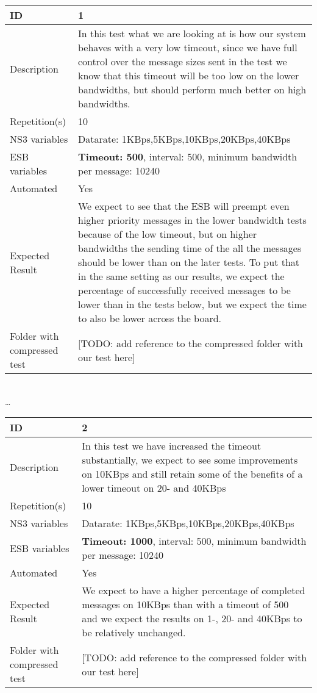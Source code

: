 \begin{center}

\begin{tabular}{| p{4cm} | p{8cm} |}%
	\hline
	ID & 1 \\
	\hline
	Description &  In this test what we are looking at is how our system behaves with a very low timeout, since we have full control over the message sizes sent in the test we know that this timeout will be too low on the lower bandwidths, but should perform much better on high bandwidths. \\
	\hline
	Repetition(s) & 10 \\
	\hline
	NS3 variables & Datarate: 1KBps,5KBps,10KBps,20KBps,40KBps \\
	\hline
	ESB variables & \textbf{Timeout: 500}, interval: 500, minimum bandwidth per message: 10240 \\
	\hline
	Automated & Yes \\
	\hline
	Expected Result & We expect to see that the ESB will preempt even higher priority messages in the lower bandwidth tests because of the low timeout, but on higher bandwidths the sending time of the all the messages should be lower than on the later tests. To put that in the same setting as our results, we expect the percentage of successfully received messages to be lower than in the tests below, but we expect the time to also be lower across the board.  \\
	\hline
	Folder with compressed test & [TODO: add reference to the compressed folder with our test here]\\
	\hline
\end{tabular}

\\ \ldots \\

\begin{tabular}{| p{4cm} | p{8cm} |}%
	\hline
	ID & 2 \\
	\hline
	Description & In this test we have increased the timeout substantially, we expect to see some improvements on 10KBps and still retain some of the benefits of a lower timeout on 20- and 40KBps \\
	\hline
	Repetition(s) & 10 \\
	\hline
	NS3 variables & Datarate: 1KBps,5KBps,10KBps,20KBps,40KBps \\
	\hline
	ESB variables & \textbf{Timeout: 1000}, interval: 500, minimum bandwidth per message: 10240 \\
	\hline
	Automated & Yes \\
	\hline
	Expected Result & We expect to have a higher percentage of completed messages on 10KBps than with a timeout of 500 and we expect the results on 1-, 20- and 40KBps to be relatively unchanged. \\
	\hline
	Folder with compressed test & [TODO: add reference to the compressed folder with our test here]\\
	\hline
\end{tabular}


\end{center}

